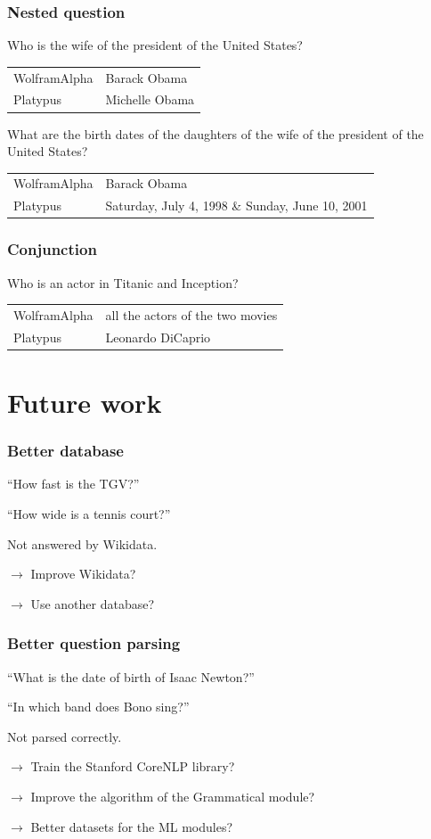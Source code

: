 \begin{frame}
    \frametitle{Nested question}

Who is the wife of the president of the United States?
    \begin{tabular}{ll}
        \alert{WolframAlpha} & Barack Obama\\
        \alert{Platypus} & Michelle Obama\\
    \end{tabular}

    \medbreak

    What are the birth dates of the daughters of the wife of the president of the United States?
    \begin{tabular}{ll}
        \alert{WolframAlpha} & Barack Obama\\
        \alert{Platypus} & Saturday, July 4, 1998 \& Sunday, June 10, 2001\\
    \end{tabular}
\end{frame}

\begin{frame}[fragile]
    \frametitle{Conjunction}

Who is an actor in Titanic and Inception?
    \begin{tabular}{ll}
        \alert{WolframAlpha} & all the actors of the two movies\\
        \alert{Platypus} & Leonardo DiCaprio\\
    \end{tabular}
\end{frame}

\section{Future work}

\begin{frame}
    \frametitle{Better database}

    ``How fast is the TGV?''

    ``How wide is a tennis court?''

    Not answered by \alert{Wikidata}.

    \medbreak

    $\rightarrow$ Improve Wikidata?

    $\rightarrow$ Use another database?
\end{frame}

\begin{frame}
    \frametitle{Better question parsing}

    ``What is the date of birth of Isaac Newton?''

    ``In which band does Bono sing?''

    Not parsed correctly.

    \medbreak

    $\rightarrow$ Train the Stanford CoreNLP library?

    $\rightarrow$ Improve the algorithm of the Grammatical module?

    $\rightarrow$ Better datasets for the ML modules?
\end{frame}

